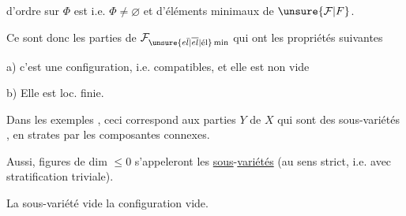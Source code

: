 
d'ordre sur $\Phi$ est  i.e. $\Phi\neq\varnothing$ et  d'éléments minimaux de $\unsure{\mathcal{F}|F}$.

Ce sont donc les  parties de $\mathcal{F}_{\unsure{e\bar l|\overline{el}|\text{él}}\,\mathrm{min}}$ qui ont les propriétés suivantes

a) c'est une configuration, i.e.    compatibles, et elle est non vide

b) Elle est loc. finie.

Dans les exemples , ceci correspond aux parties  $Y$ de $X$ qui sont des sous-variétés ,  en strates par les composantes connexes.

Aussi,  figures de dim $\leq 0$ s'appeleront les \uline{sous}-\uline{variétés} (au sens strict, i.e. avec stratification triviale).

La sous-variété vide   la configuration vide.
